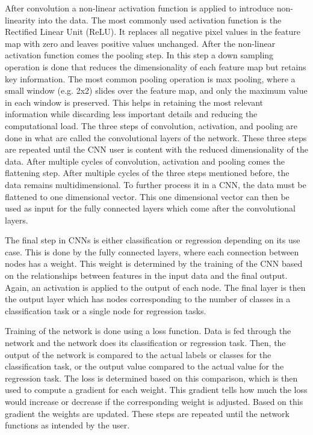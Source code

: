 \documentclass[conference]{IEEEtran}
\begin{document}
After convolution a non-linear activation function is applied to introduce non-linearity into the data. The most commonly used activation function is the Rectified Linear Unit (ReLU). It replaces all negative pixel values in the feature map with zero and leaves positive values unchanged. 
After the non-linear activation function comes the pooling step. In this step a down sampling operation is done that reduces the dimensionality of each feature map but retains key information. The most common pooling operation is max pooling, where a small window (e.g. 2x2) slides over the feature map, and only the maximum value in each window is preserved. This helps in retaining the most relevant information while discarding less important details and reducing the computational load. The three steps of convolution, activation, and pooling are done in what are called the convolutional layers of the network. These three steps are repeated until the CNN user is content with the reduced dimensionality of the data.
After multiple cycles of convolution, activation and pooling comes the flattening step. After multiple cycles of the three steps mentioned before, the data remains multidimensional. To further process it in a CNN, the data must be flattened to one dimensional vector. This one dimensional vector can then be used as input for the fully connected layers which come after the convolutional layers.

The final step in CNNs is either classification or regression depending on its use case. This is done by the fully connected layers, where each connection between nodes has a weight. This weight is determined by the training of the CNN based on the relationships between features in the input data and the final output. Again, an activation is applied to the output of each node. The final layer is then the output layer which has nodes corresponding to the number of classes in a classification task or a single node for regression tasks.

Training of the network is done using a loss function. Data is fed through the network and the network does its classification or regression task. Then, the output of the network is compared to the actual labels or classes for the classification task, or the output value compared to the actual value for the regression task. The loss is determined based on this comparison, which is then used to compute a gradient for each weight. This gradient tells how much the loss would increase or decrease if the corresponding weight is adjusted. Based on this gradient the weights are updated. These steps are repeated until the network functions as intended by the user.
\end{document}
